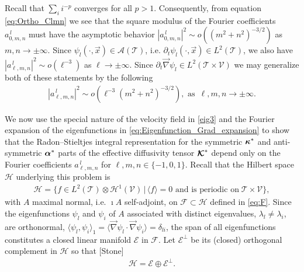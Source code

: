 \documentclass{article}
\newcommand\bkappa{\mbox{\boldmath${\kappa}$}}
\newcommand\balpha{\mbox{\boldmath${\alpha}$}}
\newcommand\Kbc{\mbox{\boldmath${\mathcal{K}}$}}
\newcommand{\Hc}{\mathcal{H}}
\newcommand{\Ac}{\mathcal{A}}
\newcommand{\Tc}{\mathcal{T}}
\newcommand{\Vc}{\mathcal{V}}
\newcommand{\Fc}{\mathcal{F}}
\newcommand{\Ec}{\mathcal{E}}
\newcommand{\0}{\mathbf{0}}
\newcommand{\1}{\mathbf{1}}
\newcommand{\2}{\mathbf{2}}
\newcommand{\3}{\mathbf{3}}
\newcommand{\4}{\mathbf{4}}
\newcommand{\5}{\mathbf{5}}
\newcommand{\6}{\mathbf{6}}
\newcommand{\7}{\mathbf{7}}
\newcommand{\8}{\mathbf{8}}
\begin{document}
Recall that $\sum_ii^{-p}$ converges for all $p>1$. Consequently, from
equation \eqref{eq:Ortho_Clmn} we see that the square modulus of the
Fourier coefficients $a^{\,l}_{0,m,n}$ must have the asymptotic behavior 
$|a^{\,l}_{0,m,n}|^2\sim o((m^2+n^2)^{-3/2})$ as $m,n\to\pm\infty$. Since
$\psi_l(\cdot,\vec{x})\in\Ac(\Tc)$, i.e. $\partial_t\psi_l(\cdot,\vec{x})\in L^2(\Tc)$, we also
have $|a^{\,l}_{\ell,m,n}|^2\sim o(\ell^{-3})$ as $\ell\to\pm\infty$. Since
$\partial_t\vec{\nabla}\psi_l\in L^2(\Tc\times\Vc)$ we may generalize 
both of these statements by the following
%
\begin{align}\label{eq:Clmn_assymptotics}
  |a^{\,l}_{\ell,m,n}|^2\sim o(\ell^{-3}(m^2+n^2)^{-3/2}), \text{ as } \,\ell,m,n\to\pm\infty.
\end{align}
%



We now use the special nature of the velocity field in \eqref{eig3}
and the Fourier expansion of the eigenfunctions in
\eqref{eq:Eigenfunction_Grad_expansion} to show that the
Radon--Stieltjes integral representation for the symmetric $\bkappa^*$
and anti-symmetric $\balpha^*$ parts of the effective diffusivity
tensor $\Kbc^*$ depend only on the Fourier coefficients
$a^{\,l}_{\ell,m,n}$ for $\ell,m,n\in\{-1,0,1\}$. Recall that the Hilbert space
$\Hc$ underlying this problem is
%
\begin{align}\label{eq:Hilbert_Space}
  \Hc=\{f\in L^2(\Tc)\otimes\Hc^1(\Vc) \,|\, \langle f\rangle=0 \text{ and is periodic on}\; \Tc\times\Vc\}, 
\end{align}
% 
with $A$ maximal normal, i.e. $\imath A$ self-adjoint, on $\Fc\subset\Hc$ defined
in \eqref{eq:F}. Since the eigenfunctions $\psi_l$ and $\psi_i$ of $A$
associated with distinct eigenvalues, $\lambda_l\neq\lambda_i$, are orthonormal,
$\langle\psi_l,\psi_i\rangle_1=\langle\vec{\nabla}\psi_l\cdot\vec{\nabla}\psi_i\rangle=\delta_{li}$, the span of all
eigenfunctions constitutes a closed linear manifold $\Ec$ in
$\Fc$. Let $\Ec^\perp$ be its (closed) orthogonal complement in $\Hc$
so that [Stone]
\begin{align}\label{eq:Hilbert_Space_Decomposition}
  \Hc=\Ec\oplus\Ec^\perp.
\end{align}
%
\end{document}
